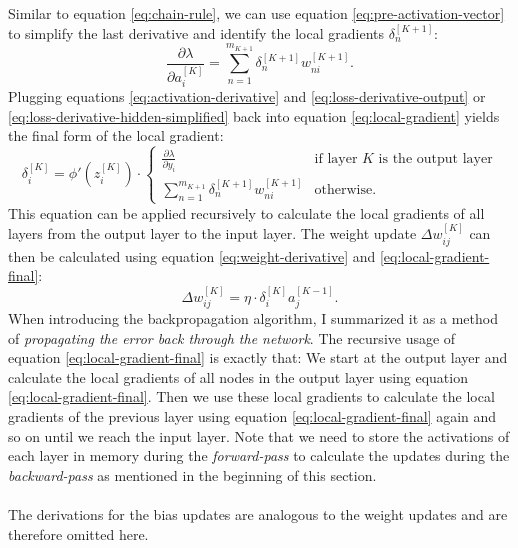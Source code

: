 Similar to equation \ref{eq:chain-rule}, we can use equation \ref{eq:pre-activation-vector} to simplify the last derivative and identify the local gradients $\delta_n^{[K+1]}$: 
\begin{equation}
    \frac{\partial \lambda}{\partial a_i^{[K]}} = \sum_{n=1}^{m_{K+1}} \delta_n^{[K+1]} w_{ni}^{[K+1]} \text{.}
    \label{eq:loss-derivative-hidden-simplified}
\end{equation}
Plugging equations \ref{eq:activation-derivative} and \ref{eq:loss-derivative-output} or \ref{eq:loss-derivative-hidden-simplified} back into equation \ref{eq:local-gradient} yields the final form of the local gradient:
\begin{equation}
    \delta_i^{[K]} = \phi'(z_i^{[K]}) \cdot \begin{cases}
         \frac{\partial \lambda}{\partial y_i} & \text{if layer } K \text{ is the output layer} \\
         \sum_{n=1}^{m_{K+1}} \delta_n^{[K+1]} w_{ni}^{[K+1]} & \text{otherwise} \text{.}
    \end{cases}
    \label{eq:local-gradient-final}
\end{equation}
This equation can be applied recursively to calculate the local gradients of all layers from the output layer to the input layer.
The weight update $\Delta w_{ij}^{[K]}$ can then be calculated using equation \ref{eq:weight-derivative} and \ref{eq:local-gradient-final}:
\begin{equation}
    \Delta w_{ij}^{[K]} = \eta \cdot \delta_i^{[K]} a_j^{[K-1]} \text{.}
    \label{eq:weight-update}
\end{equation}
When introducing the backpropagation algorithm, I summarized it as a method of \textit{propagating the error back through the network}.
The recursive usage of equation \ref{eq:local-gradient-final} is exactly that: We start at the output layer and calculate the local gradients of all nodes in the output layer using equation \ref{eq:local-gradient-final}.
Then we use these local gradients to calculate the local gradients of the previous layer using equation \ref{eq:local-gradient-final} again and so on until we reach the input layer. 
Note that we need to store the activations of each layer in memory during the \textit{forward-pass} to calculate the updates during the \textit{backward-pass} as mentioned in the beginning of this section.
\\
\\
The derivations for the bias updates are analogous to the weight updates and are therefore omitted here. 
